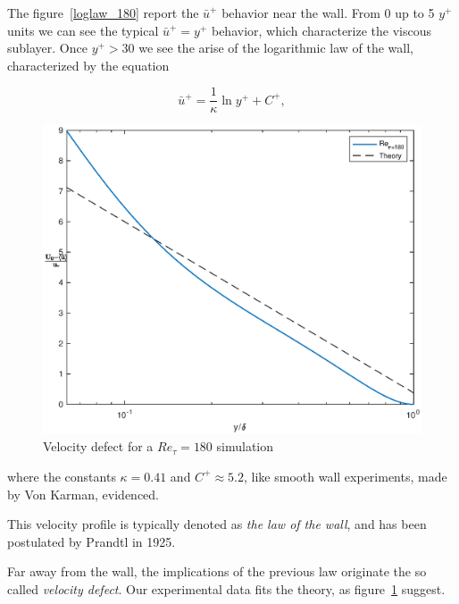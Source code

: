 The figure~\ref{loglaw_180} report the $\bar{u}^{+}$ behavior near the wall. From 0 up to 5 $y^{+}$ units we can see the typical $\bar{u}^{+}=y^{+}$ behavior, which characterize the viscous sublayer. Once $y^{+}>30$ we see the arise of the logarithmic law of the wall, characterized by the equation

\begin{equation*}
\bar{u}^{+} = \frac{1}{\kappa} \ln y^{+} +C^{+},
\end{equation*}


\begin{figure}
\begin{center}
\includegraphics[scale=0.55]{grafici/velocity_defect_180.eps}
\caption{Velocity defect for a $Re_{\tau}=180$ simulation}
\label{velocity:defect:180}
\end{center} 
\end{figure}

where the constants $\kappa=0.41$ and $C^{+}\approx 5.2$, like smooth wall experiments, made by Von Karman, evidenced. \par
This velocity profile is typically denoted as \emph{the law of the wall}, and has been postulated by Prandtl in 1925.\par
Far away from the wall, the implications of the previous law originate the so called \emph{velocity defect}.
Our experimental data fits the theory, as figure~\ref{velocity:defect:180} suggest.\\~\par

